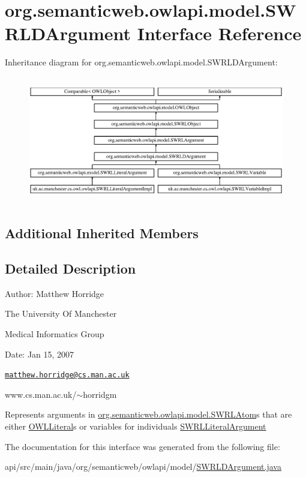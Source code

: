 \hypertarget{interfaceorg_1_1semanticweb_1_1owlapi_1_1model_1_1_s_w_r_l_d_argument}{\section{org.\-semanticweb.\-owlapi.\-model.\-S\-W\-R\-L\-D\-Argument Interface Reference}
\label{interfaceorg_1_1semanticweb_1_1owlapi_1_1model_1_1_s_w_r_l_d_argument}
}
Inheritance diagram for org.\-semanticweb.\-owlapi.\-model.\-S\-W\-R\-L\-D\-Argument\-:\begin{figure}[H]
\begin{center}
\leavevmode
\includegraphics[height=5.616045cm]{interfaceorg_1_1semanticweb_1_1owlapi_1_1model_1_1_s_w_r_l_d_argument}
\end{center}
\end{figure}
\subsection*{Additional Inherited Members}


\subsection{Detailed Description}
Author\-: Matthew Horridge\par
 The University Of Manchester\par
 Medical Informatics Group\par
 Date\-: Jan 15, 2007\par
\par
 

\href{mailto:matthew.horridge@cs.man.ac.uk}{\tt matthew.\-horridge@cs.\-man.\-ac.\-uk}\par
 www.\-cs.\-man.\-ac.\-uk/$\sim$horridgm\par
\par
 Represents arguments in \hyperlink{interfaceorg_1_1semanticweb_1_1owlapi_1_1model_1_1_s_w_r_l_atom}{org.\-semanticweb.\-owlapi.\-model.\-S\-W\-R\-L\-Atom}s that are either \hyperlink{interfaceorg_1_1semanticweb_1_1owlapi_1_1model_1_1_o_w_l_literal}{O\-W\-L\-Literal}s or variables for individuals \hyperlink{interfaceorg_1_1semanticweb_1_1owlapi_1_1model_1_1_s_w_r_l_literal_argument}{S\-W\-R\-L\-Literal\-Argument} 

The documentation for this interface was generated from the following file\-:\begin{DoxyCompactItemize}
\item 
api/src/main/java/org/semanticweb/owlapi/model/\hyperlink{_s_w_r_l_d_argument_8java}{S\-W\-R\-L\-D\-Argument.\-java}\end{DoxyCompactItemize}
